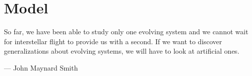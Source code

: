 \chapter{Model}
\label{chapter:model}

\epigraph{So far, we have been able to study only one evolving system and we cannot wait for interstellar flight to provide us with a second. If we want to discover generalizations about evolving systems, we will have to look at artificial ones.}{--- \textup{John Maynard Smith}}

\minitoc[n] %





